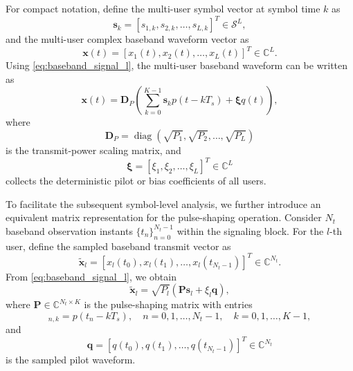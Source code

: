 \documentclass[journal]{IEEEtran}
\begin{document}
For compact notation, define the multi-user symbol vector at symbol time $k$ as
\begin{equation}
\mathbf{s}_k
=
[s_{1,k},s_{2,k},\ldots,s_{L,k}]^T
\in \mathcal{S}^{L},
\end{equation}
and the multi-user complex baseband waveform vector as
\begin{equation}
\mathbf{x}(t)
=
[x_1(t),x_2(t),\ldots,x_L(t)]^T
\in \mathbb{C}^{L}.
\end{equation}
Using \eqref{eq:baseband_signal_l}, the multi-user baseband waveform can be written as
\begin{equation}
\mathbf{x}(t)
=
\mathbf{D}_P
\left(
\sum_{k=0}^{K-1}\mathbf{s}_k p(t-kT_s)
+
\boldsymbol{\xi} q(t)
\right),
\label{eq:multiuser_baseband_signal}
\end{equation}
where
\begin{equation}
\mathbf{D}_P
=
\operatorname{diag}(\sqrt{P_1},\sqrt{P_2},\ldots,\sqrt{P_L})
\end{equation}
is the transmit-power scaling matrix, and
\begin{equation}
\boldsymbol{\xi}
=
[\xi_1,\xi_2,\ldots,\xi_L]^T
\in\mathbb{C}^{L}
\end{equation}
collects the deterministic pilot or bias coefficients of all users.

To facilitate the subsequent symbol-level analysis, we further introduce an equivalent matrix representation for the pulse-shaping operation. 
Consider $N_t$ baseband observation instants $\{t_n\}_{n=0}^{N_t-1}$ within the signaling block. 
For the $l$-th user, define the sampled baseband transmit vector as
\begin{equation}
\tilde{\mathbf{x}}_l
=
[x_l(t_0),x_l(t_1),\ldots,x_l(t_{N_t-1})]^T
\in\mathbb{C}^{N_t}.
\end{equation}
From \eqref{eq:baseband_signal_l}, we obtain
\begin{equation}
\tilde{\mathbf{x}}_l
=
\sqrt{P_l}
\left(
\mathbf{P}\mathbf{s}_l
+
\xi_l\mathbf{q}
\right),
\label{eq:sampled_baseband_l}
\end{equation}
where $\mathbf{P}\in\mathbb{C}^{N_t\times K}$ is the pulse-shaping matrix with entries
\begin{equation}
[\mathbf{P}]_{n,k}
=
p(t_n-kT_s),
\quad
n=0,1,\ldots,N_t-1,\quad
k=0,1,\ldots,K-1,
\label{eq:pulse_shaping_matrix}
\end{equation}
and
\begin{equation}
\mathbf{q}
=
[q(t_0),q(t_1),\ldots,q(t_{N_t-1})]^T
\in\mathbb{C}^{N_t}
\end{equation}
is the sampled pilot waveform.
\end{document}
